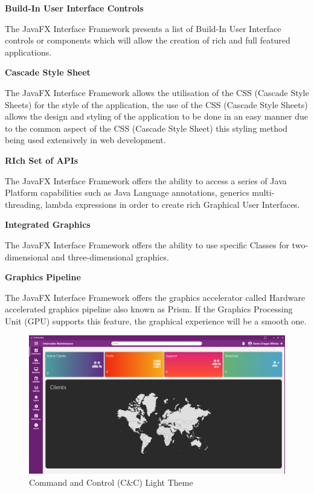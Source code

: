 \noindent
\textbf{Build-In User Interface Controls}
\newline

The JavaFX Interface Framework presents a list of Build-In User Interface controls or
components which will allow the creation of rich and full featured applications. \newline

\noindent
\textbf{Cascade Style Sheet}
\newline

The JavaFX Interface Framework allows the utilisation of the CSS (Cascade Style Sheets)
for the style of the application, the use of the CSS (Cascade Style Sheets) allows the
design and styling of the application to be done in an easy manner due to the common
aspect of the CSS (Cascade Style Sheet) this styling method being used extensively in
web development. \newline

\noindent
\textbf{RIch Set of APIs}
\newline

The JavaFX Interface Framework offers the ability to access a series of Java Platform
capabilities such as Java Language annotations, generics multi-threading, lambda
expressions in order to create rich Graphical User Interfaces. \newline

\noindent
\textbf{Integrated Graphics}
\newline

The JavaFX Interface Framework offers the ability to use specific Classes for two-dimensional
and three-dimensional graphics. \newline

\noindent
\textbf{Graphics Pipeline}
\newline

The JavaFX Interface Framework offers the graphics accelerator called Hardware accelerated
graphics pipeline also known as Prism. If the Graphics Processing Unit (GPU)
supports this feature, the graphical experience will be a smooth one.

\newpage

\begin{figure}[h]
    \centering
    \includegraphics[width=1.0\textwidth]{images/dashboard-light-theme.pdf}
    \captionsetup{justification=centering}
    \caption[Command and Control (C\&C) Light Theme]{Command and Control (C\&C) Light Theme}
    \label{fig:command-light-theme}
\end{figure}

